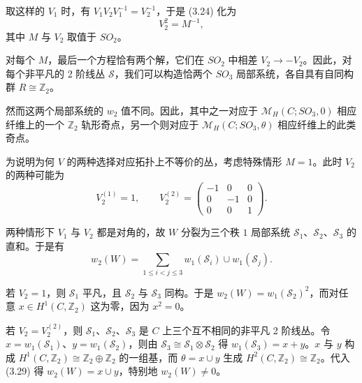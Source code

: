 取这样的 $V_1$ 时，有 $V_1V_2V_1^{-1}=V_2^{-1}$，于是 (3.24) 化为
\begin{equation}\tag{3.27}
V_2^2=M^{-1},
\end{equation}
其中 $M$ 与 $V_2$ 取值于 $SO_2$。

对每个 $M$，最后一个方程恰有两个解，它们在 $SO_2$ 中相差 $V_2\to-V_2$。因此，对每个非平凡的 2 阶线丛 $\mathcal{S}$，我们可以构造恰两个 $SO_3$ 局部系统，各自具有自同构群 $R\cong\mathbb{Z}_2$。

然而这两个局部系统的 $w_2$ 值不同。因此，其中之一对应于 $\mathcal{M}_H(C;SO_3,0)$ 相应纤维上的一个 $\mathbb{Z}_2$ 轨形奇点，另一个则对应于 $\mathcal{M}_H(C;SO_3,\theta)$ 相应纤维上的此类奇点。

为说明为何 $V$ 的两种选择对应拓扑上不等价的丛，考虑特殊情形 $M=1$。此时 $V_2$ 的两种可能为
\begin{equation}\tag{3.28}
V_2^{(1)}=1,\qquad
V_2^{(2)}=
\begin{pmatrix}
-1 & 0 & 0\\
0 & -1 & 0\\
0 & 0 & 1
\end{pmatrix}.
\end{equation}


两种情形下 $V_1$ 与 $V_2$ 都是对角的，故 $W$ 分裂为三个秩 $1$ 局部系统 $\mathcal{S}_1$、$\mathcal{S}_2$、$\mathcal{S}_3$ 的直和。于是有
\begin{equation}\tag{3.29}
w_2(W)=\sum_{1\le i<j\le3}w_1(\mathcal{S}_i)\cup w_1(\mathcal{S}_j).
\end{equation}

若 $V_2=1$，则 $\mathcal{S}_1$ 平凡，且 $\mathcal{S}_2$ 与 $\mathcal{S}_3$ 同构。于是 $w_2(W)=w_1(\mathcal{S}_2)^2$，而对任意 $x\in H^1(C,\mathbb{Z}_2)$ 这为零，因为 $x^2=0$。

若 $V_2=V_2^{(2)}$，则 $\mathcal{S}_1$、$\mathcal{S}_2$、$\mathcal{S}_3$ 是 $C$ 上三个互不相同的非平凡 2 阶线丛。令 $x=w_1(\mathcal{S}_1)$、$y=w_1(\mathcal{S}_2)$，则由 $\mathcal{S}_3\cong\mathcal{S}_1\otimes\mathcal{S}_2$ 得 $w_1(\mathcal{S}_3)=x+y$。$x$ 与 $y$ 构成 $H^1(C,\mathbb{Z}_2)\cong\mathbb{Z}_2\oplus\mathbb{Z}_2$ 的一组基，而 $\theta=x\cup y$ 生成 $H^2(C,\mathbb{Z}_2)\cong\mathbb{Z}_2$。代入 (3.29) 得 $w_2(W)=x\cup y$，特别地 $w_2(W)\ne0$。

